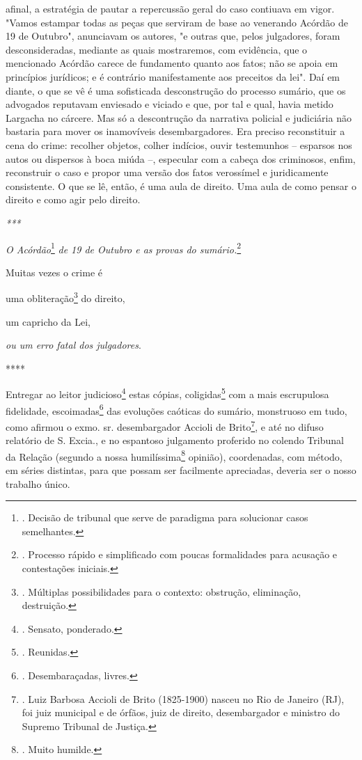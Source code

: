 {afinal, a estratégia de pautar a repercussão geral do caso contiuava em
vigor. "Vamos estampar todas as peças que serviram de base ao venerando
Acórdão de 19 de Outubro", anunciavam os autores, "e outras que, pelos
julgadores, foram desconsideradas, mediante as quais mostraremos, com
evidência, que o mencionado Acórdão carece de fundamento quanto aos
fatos; não se apoia em princípios jurídicos; e é contrário
manifestamente aos preceitos da lei". Daí em diante, o que se vê é uma
sofisticada desconstrução do processo sumário, que os advogados
reputavam enviesado e viciado e que, por tal e qual, havia metido
Largacha no cárcere. Mas só a descontrução da narrativa policial e
judiciária não bastaria para mover os inamovíveis desembargadores. Era
preciso reconstituir a cena do crime: recolher objetos, colher indícios,
ouvir testemunhos -- esparsos nos autos ou dispersos à boca miúda --,
especular com a cabeça dos criminosos, enfim, reconstruir o caso e
propor uma versão dos fatos verossímel e juridicamente consistente. O
que se lê, então, é uma aula de direito. Uma aula de como pensar o
direito e como agir pelo direito. }

\emph{***}

\emph{O Acórdão}\footnote{. Decisão de tribunal que serve de paradigma
  para solucionar casos semelhantes.} \emph{de 19 de Outubro e as provas
do sumário.}\footnote{. Processo rápido e simplificado com poucas
  formalidades para acusação e contestações iniciais.}

Muitas vezes o crime é

uma obliteração\footnote{. Múltiplas possibilidades para o contexto:
  obstrução, eliminação, destruição.} do direito,

um capricho da Lei,

\emph{ou um erro fatal dos julgadores}.

****

Entregar ao leitor judicioso\footnote{. Sensato, ponderado.} estas
cópias, coligidas\footnote{. Reunidas.} com a mais escrupulosa
fidelidade, escoimadas\footnote{. Desembaraçadas, livres.} das evoluções
caóticas do sumário, monstruoso em tudo, como afirmou o exmo. sr.
desembargador Accioli de Brito\footnote{. Luiz Barbosa Accioli de Brito
  (1825-1900) nasceu no Rio de Janeiro (RJ), foi juiz municipal e de
  órfãos, juiz de direito, desembargador e ministro do Supremo Tribunal
  de Justiça.}, e até no difuso relatório de S. Excia., e no espantoso
julgamento proferido no colendo Tribunal da Relação (segundo a nossa
humilíssima\footnote{. Muito humilde.} opinião), coordenadas, com
método, em séries distintas, para que possam ser facilmente apreciadas,
deveria ser o nosso trabalho único.

